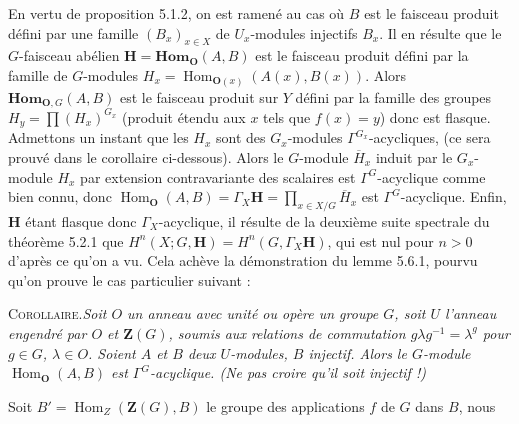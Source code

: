 En vertu de proposition 5.1.2, on est ramené au cas où $B$ est le faisceau
produit défini par une famille $(B_x)_{x\in X}$ de $U_x$-modules injectifs
$B_x$. Il en résulte que le $G$-faisceau abélien
$\mathbf H=\mathbf{Hom}_{\mathbf O}(A,B)$ est le faisceau produit défini par la famille
de $G$-modules
$H_x=\operatorname{Hom}_{{\mathbf O}(x)}(A(x),B(x))$.
Alors $\mathbf{Hom}_{{\mathbf O},G}(A,B)$ est le faisceau produit sur $Y$ défini par la
famille des groupes
$H_y=\displaystyle\prod (H_x)^{G_x}$ (produit étendu aux $x$ tels que $f(x)=y$) donc est flasque.
Admettons un instant que les $H_x$ sont des $G_x$-modules
$\Gamma^{G_x}$-acycliques, (ce sera prouvé dans le corollaire ci-dessous).
Alors le $G$-module $\overline H_x$ induit par le $G_x$-module $H_x$ par
extension contravariante des scalaires est $\Gamma^G$-acyclique comme bien
connu, donc
$\operatorname{Hom}_{\mathbf O}(A,B)=\Gamma_X\mathbf H
=\displaystyle\prod_{x\in X/G}\overline H_x
$ est $\Gamma^G$-acyclique. Enfin, $\mathbf H$ étant flasque donc $\Gamma_X$-acyclique, il résulte de la
deuxième suite spectrale du théorème 5.2.1 que
$H^n(X;G,\mathbf H)=H^n(G,\Gamma_X\mathbf H)$, qui est nul pour $n>0$ d'après ce qu'on a vu. Cela achève la
démonstration du lemme 5.6.1, pourvu qu'on prouve le cas particulier suivant :

\textsc{Corollaire.}\quad \textit{Soit $O$ un anneau avec unité ou
opère un groupe $G$, soit $U$ l'anneau engendré par $O$ et $\mathbf Z(G)$,
soumis aux relations de commutation $g\lambda g^{-1}=\lambda^g$ pour $g\in G$,
$\lambda\in O$. Soient $A$ et $B$ deux $U$-modules, $B$ injectif. Alors le
$G$-module $\operatorname{Hom}_{\mathbf O}(A,B)$ est $\Gamma^G$-acyclique. (Ne pas croire
qu'il soit injectif !)}

Soit $B'=\operatorname{Hom}_{Z}(\mathbf Z(G),B)$ le groupe des
applications $f$ de $G$ dans $B$, nous

